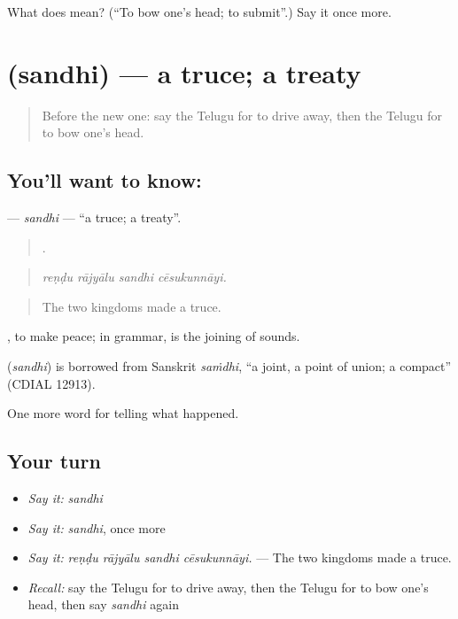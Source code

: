 \begin{tcolorbox}[breakable,colback=teal!4,colframe=teal!35!black,title={Before you move on}]
What does  mean? (\textquotedblleft{}To bow one's head; to submit\textquotedblright{}.) Say it once more.
\end{tcolorbox}
\section[\texorpdfstring{\te{సంధి} (sandhi)}{సంధి (sandhi)}]{ (sandhi) — a truce; a treaty}

\label{lesson:TE-C362-sandhi}



\begin{quote}
Before the new one: say the Telugu for to drive away, then the Telugu for to bow one's head.
\end{quote}

\subsection*{You'll want to know: }
\textbf{} — \emph{sandhi} — \textquotedblleft{}a truce; a treaty\textquotedblright{}.

\begin{quote}
   .
\end{quote}

\begin{quote}
\emph{reṇḍu rājyālu sandhi cēsukunnāyi.}
\end{quote}

\begin{quote}
The two kingdoms made a truce.
\end{quote}

 , to make peace; in grammar,  is the joining of sounds.

\begin{cousinweb}
\textbf{} (\emph{sandhi}) is borrowed from Sanskrit \emph{saṁdhi}, \textquotedblleft{}a joint, a point of union; a compact\textquotedblright{} (CDIAL 12913).
\end{cousinweb}

\begin{grammarlens}[title={What you've built}]
One more word for telling what happened.
\end{grammarlens}

\subsection*{Your turn}
\begin{itemize}
\raggedright
  \item \emph{Say it:} \emph{sandhi}
  \item \emph{Say it:} \emph{sandhi}, once more
  \item \emph{Say it:} \emph{reṇḍu rājyālu sandhi cēsukunnāyi.} — The two kingdoms made a truce.
  \item \emph{Recall:} say the Telugu for to drive away, then the Telugu for to bow one's head, then say \emph{sandhi} again
\end{itemize}

